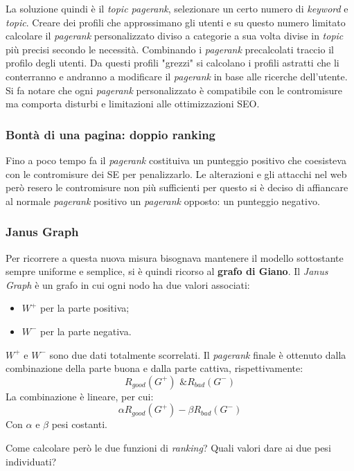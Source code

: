 				La soluzione quindi è il \emph{topic pagerank}, selezionare un certo numero di \emph{keyword} e \emph{topic}. Creare dei profili che approssimano gli utenti e su questo numero limitato calcolare il \emph{pagerank} personalizzato diviso a categorie a sua volta divise in \emph{topic} più precisi secondo le necessità. Combinando i \emph{pagerank} precalcolati traccio il profilo degli utenti. Da questi profili "grezzi" si calcolano i profili astratti che li conterranno e andranno a modificare il \emph{pagerank} in base alle ricerche dell'utente. Si fa notare che ogni \emph{pagerank} personalizzato è compatibile con le contromisure ma comporta disturbi e limitazioni alle ottimizzazioni SEO.
			
			\subsubsection{Bontà di una pagina: doppio ranking}
				Fino a poco tempo fa il \emph{pagerank} costituiva un punteggio positivo che coesisteva con le contromisure dei SE per penalizzarlo. 
				Le alterazioni e gli attacchi nel web però resero le contromisure non più sufficienti per questo si è deciso di affiancare al normale \emph{pagerank} positivo un \emph{pagerank} opposto: un punteggio negativo.
			
			\subsubsection{Janus Graph}
				Per ricorrere a questa nuova misura bisognava mantenere il modello sottostante sempre uniforme e semplice, si è quindi ricorso al \textbf{grafo di Giano}.
				Il \emph{Janus Graph} è un grafo in cui ogni nodo ha due valori associati:
				\begin{itemize}
					\item $W^+$ per la parte positiva;
					\item $W^-$ per la parte negativa.	
				\end{itemize}	
				$W^+$ e $W^-$ sono due dati totalmente scorrelati. Il \emph{pagerank} finale è ottenuto dalla combinazione della parte buona e dalla parte cattiva, rispettivamente:
				\[
					R_{good}(G^+) \text{  \&  } R_{bad}(G^-)
				\]
				La combinazione è lineare, per cui:
				\[
					\alpha R_{good}(G^+) - \beta R_{bad}(G^-)
				\]
				Con $\alpha$ e $\beta$ pesi costanti.
				
				Come calcolare però le due funzioni di \emph{ranking}? Quali valori dare ai due pesi individuati?
									
